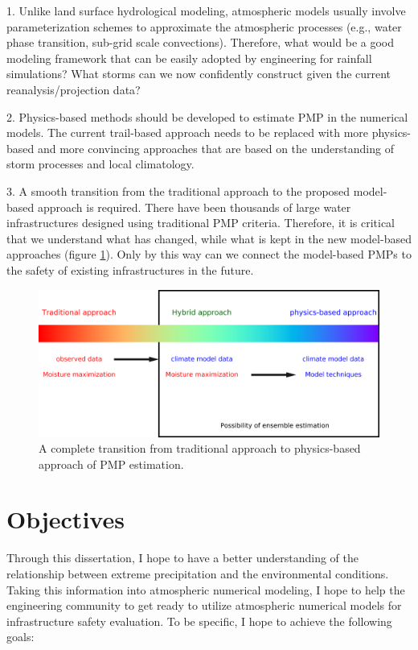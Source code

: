 1. Unlike land surface hydrological modeling, atmospheric models usually involve parameterization schemes to approximate the atmospheric processes (e.g., water phase transition, sub-grid scale convections). Therefore, what would be a good modeling framework that can be easily adopted by engineering for rainfall simulations? What storms can we now confidently construct given the current reanalysis/projection data?

2. Physics-based methods should be developed to estimate PMP in the numerical models. The current trail-based approach needs to be replaced with more physics-based and more convincing approaches that are based on the understanding of storm processes and local climatology.

3. A smooth transition from the traditional approach to the proposed model-based approach is required. There have been thousands of large water infrastructures designed using traditional PMP criteria. Therefore, it is critical that we understand what has changed, while what is kept in the new model-based approaches (figure \ref{fig:1-1}). Only by this way can we connect the model-based PMPs to the safety of existing infrastructures in the future.

\begin{figure}[htbp]
	\centering
	\includegraphics[width=\linewidth]{pics/ch1/fig1.png}
	\caption{A complete transition from traditional approach to physics-based approach of PMP estimation.}
    \label{fig:1-1}
\end{figure}

\section {Objectives}

Through this dissertation, I hope to have a better understanding of the relationship between extreme precipitation and the environmental conditions. Taking this information into atmospheric numerical modeling, I hope to help the engineering community to get ready to utilize atmospheric numerical models for infrastructure safety evaluation. To be specific, I hope to achieve the following goals:

